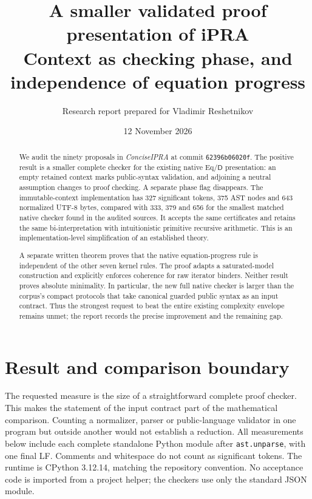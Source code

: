\documentclass[11pt,a4paper]{article}
\title{A smaller validated proof presentation of iPRA\\[4pt]
\large Context as checking phase, and independence of equation progress}
\author{Research report prepared for Vladimir Reshetnikov}
\date{12 November 2026}
\theoremstyle{definition}\newtheorem{definition}[theorem]{Definition}
\theoremstyle{remark}\newtheorem{remark}[theorem]{Remark}
\newcommand{\D}{\mathsf D}
\begin{document}
\maketitle
\begin{abstract}
We audit the ninety proposals in \emph{ConciseIPRA} at commit
\texttt{62396b06020f}.
The positive result is a smaller complete checker for the existing native
Eq/$\D$ presentation: an empty retained context marks public-syntax validation,
and adjoining a neutral assumption changes to proof checking. A separate
phase flag disappears. The immutable-context implementation has
327 significant tokens, 375 AST nodes and 643 normalized UTF-8 bytes,
compared with 333, 379 and 656 for the smallest matched native checker
found in the audited sources. It accepts the same certificates and retains
the same bi-interpretation with intuitionistic primitive recursive arithmetic.
This is an implementation-level simplification of an established theory.

A separate written theorem proves that the native equation-progress rule
is independent of the other seven kernel rules. The proof adapts a
saturated-model construction and explicitly enforces coherence for raw
iterator binders. Neither result proves absolute minimality. In particular,
the new full native checker is larger than the corpus's compact protocols
that take canonical guarded public syntax as an input contract. Thus the
strongest request to beat the entire existing complexity envelope remains
unmet; the report records the precise improvement and the remaining gap.
\end{abstract}
\tableofcontents
\newpage

\section{Result and comparison boundary}
The requested measure is the size of a straightforward complete proof
checker. This makes the statement of the input contract part of the
mathematical comparison. Counting a normalizer, parser or public-language
validator in one program but outside another would not establish a reduction.
All measurements below include each complete standalone Python module after
\texttt{ast.unparse}, with one final LF. Comments and whitespace
do not count as significant tokens. The runtime is CPython
3.12.14, matching the repository convention. No acceptance code is imported
from a project helper; the checkers use only the standard JSON module.
\end{document}
